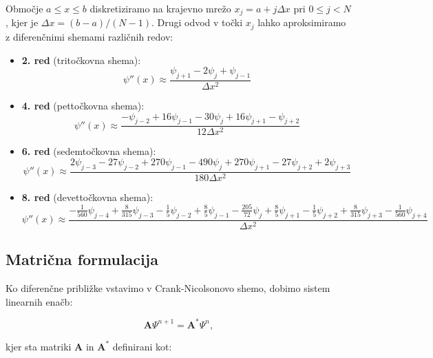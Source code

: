 \documentclass[12pt,a4paper]{article}
\begin{document}
Območje $a \leq x \leq b$ diskretiziramo na krajevno mrežo $x_j = a + j\Delta x$ pri $0 \leq j < N$, kjer je $\Delta x = (b - a)/(N - 1)$. Drugi odvod v točki $x_j$ lahko aproksimiramo z diferenčnimi shemami različnih redov:

\begin{itemize}
    \item \textbf{2. red} (tritočkovna shema):
    \begin{equation}
    \psi''(x) \approx \frac{\psi_{j+1} - 2\psi_j + \psi_{j-1}}{\Delta x^2}
    \end{equation}
    
    \item \textbf{4. red} (pettočkovna shema):
    \begin{equation}
    \psi''(x) \approx \frac{-\psi_{j-2} + 16\psi_{j-1} - 30\psi_j + 16\psi_{j+1} - \psi_{j+2}}{12\Delta x^2}
    \end{equation}
    
    \item \textbf{6. red} (sedemtočkovna shema):
    \begin{equation}
    \psi''(x) \approx \frac{2\psi_{j-3} - 27\psi_{j-2} + 270\psi_{j-1} - 490\psi_j + 270\psi_{j+1} - 27\psi_{j+2} + 2\psi_{j+3}}{180\Delta x^2}
    \end{equation}
    
    \item \textbf{8. red} (devettočkovna shema):
    \begin{equation}
    \psi''(x) \approx \frac{-\frac{1}{560}\psi_{j-4} + \frac{8}{315}\psi_{j-3} - \frac{1}{5}\psi_{j-2} + \frac{8}{5}\psi_{j-1} - \frac{205}{72}\psi_j + \frac{8}{5}\psi_{j+1} - \frac{1}{5}\psi_{j+2} + \frac{8}{315}\psi_{j+3} - \frac{1}{560}\psi_{j+4}}{\Delta x^2}
    \end{equation}
\end{itemize}

\subsection{Matrična formulacija}

Ko diferenčne približke vstavimo v Crank-Nicolsonovo shemo, dobimo sistem linearnih enačb:

\begin{equation}
\mathbf{A} \Psi^{n+1} = \mathbf{A}^* \Psi^n,
\end{equation}

kjer sta matriki $\mathbf{A}$ in $\mathbf{A}^*$ definirani kot:
\end{document}
